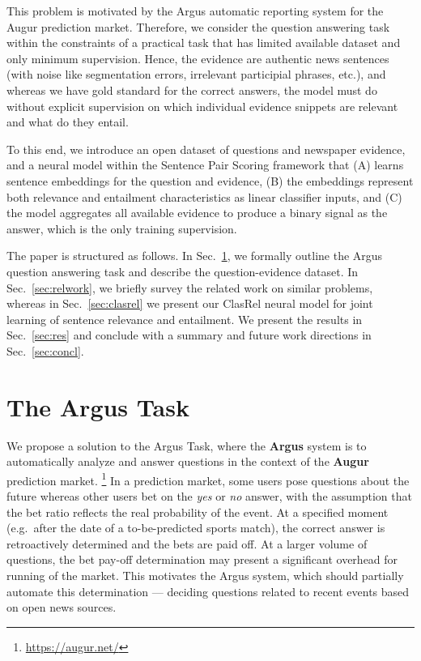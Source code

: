 \documentclass[11pt]{article}
\begin{document}
This problem is motivated by the Argus automatic reporting system for
the Augur prediction market. \cite{argus}  Therefore, we consider the question answering task
within the constraints of a practical task that has limited available dataset
and only minimum supervision.  Hence, the evidence are authentic news
sentences (with noise like segmentation errors, irrelevant participial phrases, etc.),
and whereas we have gold standard for
the correct answers, the model must do without explicit supervision on
which individual evidence snippets are relevant and what do they entail.

To this end, we introduce an open dataset of questions and newspaper evidence,
and a neural model within the Sentence Pair Scoring framework \cite{sps}
that (A) learns sentence embeddings for the question and evidence,
(B) the embeddings represent both relevance and entailment characteristics
as linear classifier inputs, and (C) the model aggregates all available evidence
to produce a binary signal as the answer, which is the only training supervision.

The paper is structured as follows.  In Sec.~\ref{sec:argus}, we formally outline
the Argus question answering task and describe the question-evidence dataset.
In Sec.~\ref{sec:relwork}, we briefly survey the related work on similar problems,
whereas in Sec.~\ref{sec:clasrel} we present our ClasRel neural model for joint
learning of sentence relevance and entailment.  We present the results in Sec.~\ref{sec:res}
and conclude with a summary and future work directions in Sec.~\ref{sec:concl}.

\section{The Argus Task}
\label{sec:argus}

We propose a solution to the Argus Task, where
the \textbf{Argus} system \cite{arguswp} \cite{argus}
is to automatically analyze and answer questions
in the context of the \textbf{Augur} prediction market.%
\footnote{\url{https://augur.net/}}
In a prediction market, some users pose questions about the future
whereas other users bet on the \textit{yes} or \textit{no} answer,
with the assumption that the bet ratio reflects the real probability
of the event.  At a specified moment (e.g.\ after the date of a to-be-predicted sports match), the
correct answer is retroactively determined and the bets are paid off.
At a larger volume of questions, the bet pay-off determination may
present a significant overhead for running of the market.
This motivates the Argus system, which should partially automate
this determination --- deciding questions related to recent events
based on open news sources.
\end{document}

